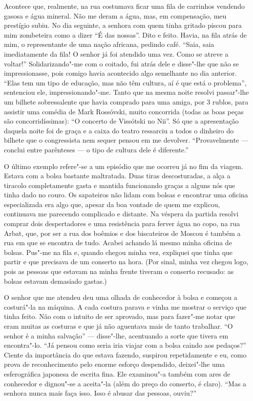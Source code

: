 Acontece que, realmente, na rua costumava ficar uma fila de carrinhos
vendendo gasosa e água mineral. Não me deram a água, mas, em
compensação, meu prestígio subiu. No dia seguinte, a senhora com quem
tinha gritado piscou para mim zombeteira como a dizer ``É das nossas''.
Dito e feito. Havia, na fila atrás de mim, o representante de uma nação
africana, pedindo café. ``Saia, saia imediatamente da fila! O senhor já
foi atendido uma vez. Como se atreve a voltar!'' Solidarizando"-me com o
coitado, fui atrás dele e disse"-lhe que não se impressionasse, pois
comigo havia acontecido algo semelhante no dia anterior. ``Elas tem um
tipo de educação, mas não têm cultura, aí é que está o problema'',
sentenciou ele, impressionando"-me. Tanto que na mesma noite resolvi
passar"-lhe um bilhete sobressalente que havia comprado para uma amiga,
por 3 rublos, para assistir uma comédia de Mark Rossóvski, muito
concorrida (todas as boas peças são concorridíssimas): ``O concerto de
Vissótski no Nii''. Só que a apresentação daquela noite foi de graça e a
caixa do teatro ressarciu a todos o dinheiro do bilhete que o
congressista nem sequer pensou em me devolver. ``Provavelmente ---
conclui entre parênteses --- o tipo de cultura dele é diferente.''

O último exemplo refere"-se a um episódio que me ocorreu já no fim da
viagem. Estava com a bolsa bastante maltratada. Duas tiras
descosturadas, a alça a tiracolo completamente gasta e mantida
funcionando graças a alguns nós que tinha dado no couro. Os sapateiros
não lidam com bolsas e encontrar uma oficina especializada era algo que,
apesar da boa vontade de quem me explicou, continuava me parecendo
complicado e distante. Na véspera da partida resolvi comprar dois
despertadores e uma resistência para ferver água no copo, na rua Arbat,
que, por ser a rua dos boêmios e dos biscateiros de Moscou é também a
rua em que se encontra de tudo. Acabei achando lá mesmo minha oficina de
bolsas. Pus"-me na fila e, quando chegou minha vez, expliquei que tinha
que partir e que precisava de um conserto na hora. (Por sinal, minha vez
chegou logo, pois as pessoas que estavam na minha frente tiveram o
conserto recusado: as bolsas estavam demasiado gastas.)

O senhor que me atendeu deu uma olhada de conhecedor à bolsa e começou a
costurá"-la na máquina. A cada costura parava e vinha me mostrar o
serviço que tinha feito. Não com o intuito de ser aprovado, mas para
fazer"-me notar que eram muitas as costuras e que já não aguentava mais
de tanto trabalhar. ``O senhor é a minha salvação'' --- disse"-lhe,
acentuando a sorte que tivera em encontra"-lo. ``Já pensou como seria
iria viajar com a bolsa caindo aos pedaços?'' Ciente da importância do
que estava fazendo, suspirou repetidamente e eu, como prova de
reconhecimento pelo enorme esforço despendido, deixei"-lhe uma
esferográfica japonesa de escrita fina. Ele examinou"-a também com ares
de conhecedor e dignou"-se a aceita"-la (além do preço do conserto, é
claro). ``Mas a senhora nunca mais faça isso. Isso é abusar das pessoas,
ouviu?''

